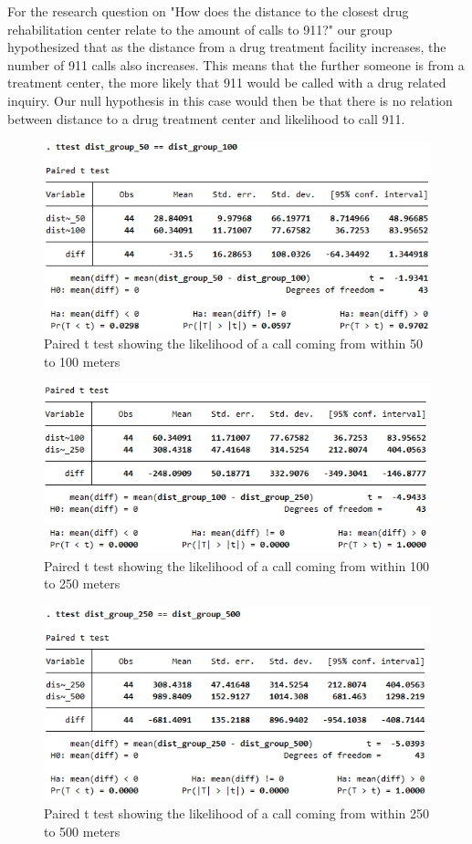\documentclass[12pt]{article}
\begin{document}
For the research question on "How does the distance to the closest drug rehabilitation center relate to the amount of calls to 911?" our group hypothesized that as the distance from a drug treatment facility increases, the number of 911 calls also increases. This means that the further someone is from a treatment center, the more  likely that 911 would be called with a drug related inquiry. Our null hypothesis in this case would then be that there is no relation between distance to a drug treatment center and likelihood to call 911. 
\begin{figure}
    \centering
    \includegraphics[width=1\linewidth]{image50-100.png}
        \caption{Paired t test showing the likelihood of a call coming from within 50 to 100 meters}
    \end{figure}
\begin{figure}
    \centering
    \includegraphics[width=1\linewidth]{image100-250.png}
    \caption{Paired t test showing the likelihood of a call coming from within 100 to 250 meters}
\end{figure}
\begin{figure}
    \centering
    \includegraphics[width=1\linewidth]{image250-500.png}
    \caption{Paired t test showing the likelihood of a call coming from within 250 to 500 meters}
\end{figure}
\end{document}
